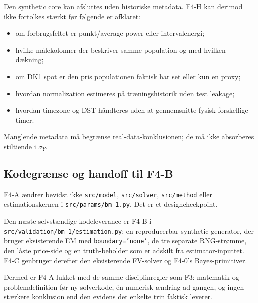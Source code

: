 Den synthetic core kan afsluttes uden historiske metadata. F4-H kan derimod ikke
fortolkes stærkt før følgende er afklaret:
\begin{itemize}
\item om forbrugsfeltet er punkt/average power eller intervalenergi;
\item hvilke målekolonner der beskriver samme population og med hvilken dækning;
\item om DK1 spot er den pris populationen faktisk har set eller kun en proxy;
\item hvordan normalization estimeres på træningshistorik uden test leakage;
\item hvordan timezone og DST håndteres uden at gennemsnitte fysisk forskellige timer.
\end{itemize}
Manglende metadata må begrænse real-data-konklusionen; de må ikke absorberes
stiltiende i \(\sigma_Y\).

\subsection{Kodegrænse og handoff til F4-B}

F4-A ændrer bevidst ikke \texttt{src/model}, \texttt{src/solver},
\texttt{src/method} eller estimationskernen i \texttt{src/params/bm\_1.py}.
Det er et designcheckpoint.

Den næste selvstændige kodeleverance er F4-B i
\texttt{src/validation/bm\_1/estimation.py}: en reproducerbar synthetic generator,
der bruger eksisterende EM med \texttt{boundary='none'}, de tre separate RNG-strømme,
den låste price-side og en truth-beholder som er adskilt fra estimator-inputtet.
F4-C genbruger derefter den eksisterende FV-solver og F4-0's Bayes-primitiver.

Dermed er F4-A lukket med de samme disciplinregler som F3: matematik og problemdefinition
før ny solverkode, én numerisk ændring ad gangen, og ingen stærkere konklusion end den
evidens det enkelte trin faktisk leverer.

